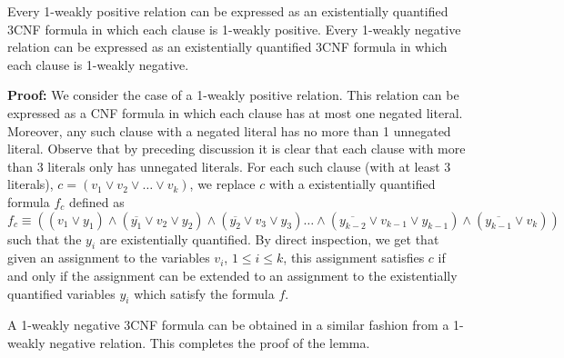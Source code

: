 \begin{lemma}\label{le:satwnto3wn}
Every 1-weakly positive relation can be expressed as an existentially
quantified 3CNF formula
in which each clause is 1-weakly positive.
Every 1-weakly negative relation can be expressed as an existentially
quantified  3CNF formula
in which each clause is 1-weakly negative.
\end{lemma}


\noindent
{\bf Proof:}
We consider the case of a 1-weakly positive relation. This relation can be
expressed as a {\sf CNF} formula in which each clause has at most one negated
literal. Moreover, any such clause with a negated literal has no more than 
1 unnegated literal.
Observe that by preceding discussion it is clear that 
each clause with more than 3 literals only has unnegated
literals. For each such clause (with at least 3 literals),
$c=(v_1 \vee v_2 \vee \ldots \vee v_k)$, 
we replace $c$ with a existentially  quantified formula
$f_c$ defined as 
\[f_c \equiv \left((v_1 \vee y_1) \wedge (\overline {y_1} \vee v_2 \vee y_2)
\wedge (\overline {y_2} \vee v_3 \vee y_3) \ldots
\wedge (\overline {y_{k-2}} \vee v_{k-1} \vee y_{k-1}) 
\wedge (\overline {y_{k-1}} \vee v_{k}) \right)\]
such that the $y_i$ are existentially quantified.
By direct inspection, we get that
given an assignment to the variables $v_i$, $1 \leq i \leq k$, 
this assignment satisfies $c$ if and only if
the assignment can be extended to an assignment to the existentially 
quantified  variables $y_i$ which satisfy the formula $f$. 

A 1-weakly negative {\sf 3CNF} formula can be obtained in a similar fashion
from a 1-weakly negative relation. This completes the proof of the lemma.\QED

